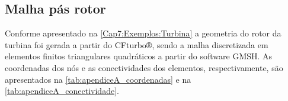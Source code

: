 
\begin{apendicesenv}
\partapendices
\chapter{Malha pás rotor} \label{apendice:malhaRotor}
\vspace{-2em}

Conforme apresentado na \autoref{Cap7:Exemplos:Turbina} a geometria do rotor da turbina foi gerada a partir do CFturbo®, sendo a malha discretizada em elementos finitos triangulares quadráticos a partir do software GMSH. As coordenadas dos nós e as conectividades dos elementos, respectivamente, são apresentados na \autoref{tab:apendiceA_coordenadas} e na \autoref{tab:apendiceA_conectividade}.


\end{apendicesenv}
